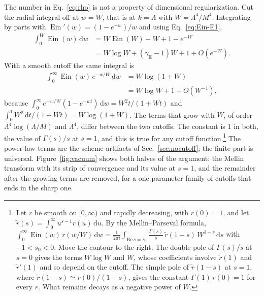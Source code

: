\documentclass[a4paper,11pt]{article}
\newcommand{\dd}{\mathrm{d}}
\newcommand{\Ein}{\operatorname{Ein}}
\newcommand{\gE}{\gamma_{\mathrm E}}
\begin{document}
The number in Eq.~\eqref{eq:rho} is not a property of dimensional regularization. Cut the radial integral off at $w=W$, that is at $k=\Lambda$ with $W=\Lambda^4/M^4$. Integrating by parts with $\Ein'(w)=(1-e^{-w})/w$ and using Eq.~\eqref{eq:Ein-E1},
\begin{align*}
\int_0^W\Ein(w)\,\dd w&=W\Ein(W)-W+1-e^{-W}\\
&=W\log W+(\gE-1)W+1+O(e^{-W}).
\end{align*}
With a smooth cutoff the same integral is
\begin{align*}
\int_0^\infty\Ein(w)\,e^{-w/W}\,\dd w&=W\log(1+W)\\
&=W\log W+1+O(W^{-1}),
\end{align*}
because $\int_0^\infty e^{-w/W}(1-e^{-wt})\,\dd w=W^2t/(1+Wt)$ and $\int_0^1W^2\,\dd t/(1+Wt)=W\log(1+W)$. The terms that grow with $W$, of order $\Lambda^4\log(\Lambda/M)$ and $\Lambda^4$, differ between the two cutoffs. The constant is $1$ in both, the value of $\Gamma(s)/s$ at $s=1$, and this is true for any cutoff function.\footnote{Let $r$ be smooth on $[0,\infty)$ and rapidly decreasing, with $r(0)=1$, and let $\tilde r(s)=\int_0^\infty u^{s-1}r(u)\,\dd u$. By the Mellin--Parseval formula, $\int_0^\infty\Ein(w)\,r(w/W)\,\dd w=\frac1{2\pi i}\int_{\mathrm{Re}\,s=s_0}\frac{\Gamma(s)}s\,\tilde r(1-s)\,W^{1-s}\,\dd s$ with $-1<s_0<0$. Move the contour to the right. The double pole of $\Gamma(s)/s$ at $s=0$ gives the terms $W\log W$ and $W$, whose coefficients involve $\tilde r(1)$ and $\tilde r'(1)$ and so depend on the cutoff. The simple pole of $\tilde r(1-s)$ at $s=1$, where $\tilde r(1-s)\simeq r(0)/(1-s)$, gives the constant $\Gamma(1)\,r(0)=1$ for every $r$. What remains decays as a negative power of $W$.} The power-law terms are the scheme artifacts of Sec.~\ref{sec:nocutoff}; the finite part is universal. Figure~\ref{fig:vacuum} shows both halves of the argument: the Mellin transform with its strip of convergence and its value at $s=1$, and the remainder after the growing terms are removed, for a one-parameter family of cutoffs that ends in the sharp one.
\end{document}
